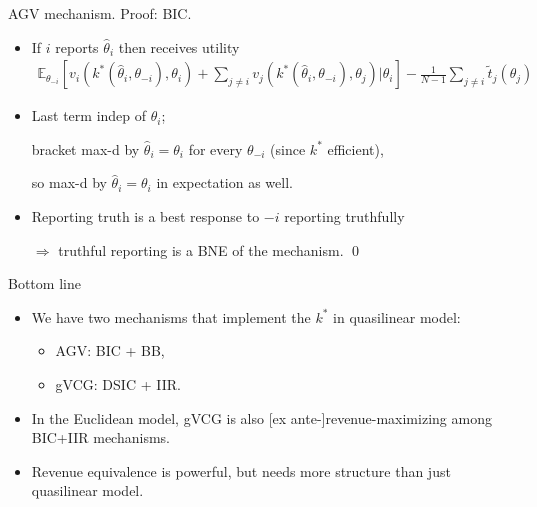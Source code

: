 \documentclass[english,10pt
,aspectratio=169
]{beamer}
\begin{document}
\begin{frame}{AGV mechanism. Proof: BIC.}
\begin{itemize}
	\item If $i$ reports $\hat{\theta}_i$ then receives utility
	{\footnotesize 
		\vspace{-0.5em}\begin{align*}
			\mathbb{E}_{\theta_{-i}} \left[ v_i(k^*(\hat{\theta}_i, \theta_{-i}), \theta_i) + \sum_{j \neq i} v_j(k^*(\hat{\theta}_i, \theta_{-i}), \theta_j) | \theta_i \right] - \frac{1}{N-1} \sum_{j \neq i} \tilde{t}_j (\theta_j)
		\end{align*}
	}
	\item Last term indep of $\hat{\theta}_i$; 
	
	bracket max-d by $\hat{\theta}_i = \theta_i$ for every $\theta_{-i}$ (since $k^*$ efficient), 
	
	so max-d by $\hat{\theta}_i = \theta_i$ in expectation as well.
	
	\item Reporting truth is a best response to $-i$ reporting truthfully 
	
	$\Rightarrow$ truthful reporting is a BNE of the mechanism. \qed
\end{itemize}
\end{frame}





\begin{frame}{Bottom line}
\begin{itemize}
	\item We have two mechanisms that implement the  $k^*$ in \alert{quasilinear} model:
	\begin{itemize}
		\item AGV: BIC + BB,
		\item gVCG: DSIC + IIR.
	\end{itemize}
	\item In the \alert{Euclidean} model, gVCG is also [ex ante-]revenue-maximizing among BIC+IIR mechanisms.
	\item Revenue equivalence is powerful, but needs more structure than just quasilinear model.
\end{itemize}
\end{frame}




\end{document}
